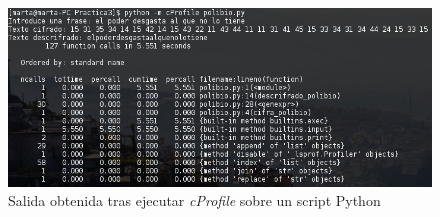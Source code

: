 \documentclass[10pt,a4paper,spanish]{article}
\numberwithin{equation}{section} %
\numberwithin{figure}{section} %
\numberwithin{table}{section} %
\begin{document}
\begin{figure}[!h]
    \centering
    \includegraphics[width=1\textwidth]{42}
    \caption{Salida obtenida tras ejecutar \textit{cProfile} sobre un script Python}
    \label{outputprofile}
\end{figure}

\end{document}
